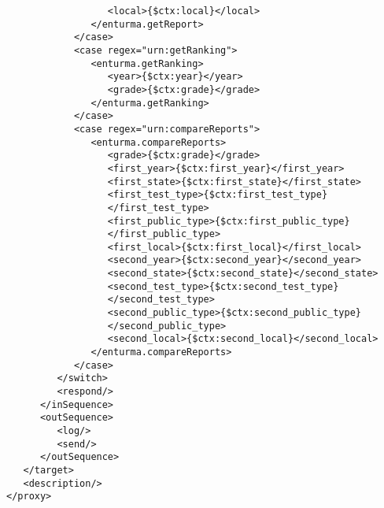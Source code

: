 \begin{apendicesenv}
\begin{lstlisting}
                  <local>{$ctx:local}</local>
               </enturma.getReport>
            </case>
            <case regex="urn:getRanking">
               <enturma.getRanking>
                  <year>{$ctx:year}</year>
                  <grade>{$ctx:grade}</grade>
               </enturma.getRanking>
            </case>
            <case regex="urn:compareReports">
               <enturma.compareReports>
                  <grade>{$ctx:grade}</grade>
                  <first_year>{$ctx:first_year}</first_year>
                  <first_state>{$ctx:first_state}</first_state>
                  <first_test_type>{$ctx:first_test_type}
                  </first_test_type>
                  <first_public_type>{$ctx:first_public_type}
                  </first_public_type>
                  <first_local>{$ctx:first_local}</first_local>
                  <second_year>{$ctx:second_year}</second_year>
                  <second_state>{$ctx:second_state}</second_state>
                  <second_test_type>{$ctx:second_test_type}
                  </second_test_type>
                  <second_public_type>{$ctx:second_public_type}
                  </second_public_type>
                  <second_local>{$ctx:second_local}</second_local>
               </enturma.compareReports>
            </case>
         </switch>
         <respond/>
      </inSequence>
      <outSequence>
         <log/>
         <send/>
      </outSequence>
   </target>
   <description/>
</proxy>

\end{lstlisting}




\end{apendicesenv}
